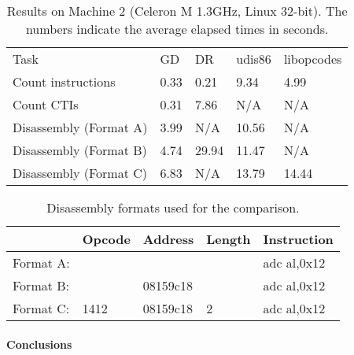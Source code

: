 \documentclass{article}
\begin{document}
\begin{table}[p]
  \centering
  \begin{tabular}[center]{l|l|l|l|l}
    Task                   & GD    & DR    & udis86 & libopcodes   \\
    Count instructions     & 0.33  & 0.21  & 9.34   & 4.99         \\
    Count CTIs             & 0.31  & 7.86  & N/A    & N/A          \\
    Disassembly (Format A) & 3.99  & N/A   & 10.56  & N/A          \\
    Disassembly (Format B) & 4.74  & 29.94 & 11.47  & N/A          \\
    Disassembly (Format C) & 6.83  & N/A   & 13.79  & 14.44        \\
  \end{tabular}
  \caption{Results on Machine 2 (Celeron M 1.3GHz, Linux 32-bit).
    The numbers indicate the average elapsed times in seconds.}
  \label{tab:machine2}
\end{table}

\begin{table}[p]
  \centering
  \begin{tabular}[center]{l|l l l l}
    & Opcode & Address  & Length & Instruction \\
    \hline
    Format A:&        &          &        & adc al,0x12 \\
    Format B:&        & 08159c18 &        & adc al,0x12 \\
    Format C:& 1412   & 08159c18 & 2      & adc al,0x12 \\
  \end{tabular}
  \caption{Disassembly formats used for the comparison.}
  \label{tab:formats}
\end{table}


\paragraph{Conclusions}
\label{sec:conclusions}
\end{document}
